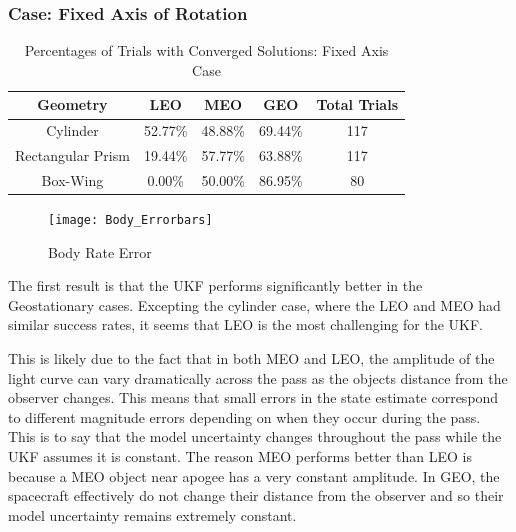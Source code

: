 \subsubsection{Case: Fixed Axis of Rotation}

\begin{table}[ht]
	\begin{center}
		\begin{tabular}{| c | c | c | c | c |}
			\hline Geometry & LEO & MEO & GEO & Total Trials\\ 
			\hline Cylinder & 52.77\% & 48.88\% & 69.44\% & 117 \\
			\hline Rectangular Prism & 19.44\% & 57.77\% & 63.88\% & 117\\
			\hline Box-Wing & 0.00\% & 50.00\% & 86.95\% & 80\\
			\hline
		\end{tabular}
	\end{center}
	\caption{Percentages of Trials with Converged Solutions: Fixed Axis Case}
\end{table}

\begin{figure}[ht]
	\begin{center}
		\texttt{[image: Body\_Errorbars]}
		\caption{Body Rate Error}
	\end{center}
\end{figure}

The first result is that the UKF performs significantly better in the Geostationary cases. Excepting the cylinder case, where the LEO and MEO had similar success rates, it seems that LEO is the most challenging for the UKF.

This is likely due to the fact that in both MEO and LEO, the amplitude of the light curve can vary dramatically across the pass as the objects distance from the observer changes. This means that small errors in the state estimate correspond to different magnitude errors depending on when they occur during the pass. This is to say that the model uncertainty changes throughout the pass while the UKF assumes it is constant. The reason MEO performs better than LEO is because a MEO object near apogee has a very constant amplitude. In GEO, the spacecraft effectively do not change their distance from the observer and so their model uncertainty remains extremely constant.

